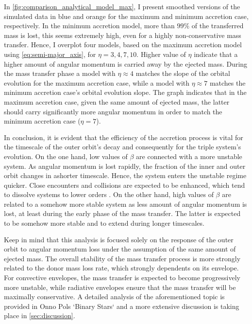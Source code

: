 In \cref{fig:comparison_analytical_model_max}, I present smoothed versions of the simulated data in blue and orange for the maximum and minimum accretion case, respectively. In the minimum accretion model, more than $99\%$ of the transferred mass is lost, this seems extremely high, even for a highly non-conservative mass transfer. Hence, I overplot four models, based on the maximum accretion model using \cref{eq:semi-major_axis}, for $\eta = 3,4,7,10$. Higher value of $\eta$ indicate that a higher amount of angular momentum is carried away by the ejected mass. During the mass transfer phase a model with $\eta \approx 4$ matches the slope of the orbital evolution for the maximum accretion case, while a model with $\eta \approx 7$ matches the minimum accretion case's orbital evolution slope. The graph indicates that in the maximum accretion case, given the same amount of ejected mass, the latter should carry significantly more angular momentum in order to match the minimum accretion case ($\eta = 7$). 

In conclusion, it is evident that the efficiency of the accretion process is vital for the timescale of the outer orbit's decay and consequently for the triple system's evolution. On the one hand, low values of $\beta$ are connected with a more unstable system. As angular momentum is lost rapidly, the fraction of the inner and outer orbit changes in ashorter timescale. Hence, the system enters the unstable regime quicker. Close encounters and collisions are expected to be enhanced, which tend to dissolve systems to lower orders \citep{van2007formation}. On the other hand, high values of $\beta$ are related to a somehow more stable system as less amount of angular momentum is lost, at least during the early phase of the mass transfer. The latter is expected to be somehow more stable and to extend during longer timescales.

Keep in mind that this analysis is focused solely on the response of the outer orbit to angular momentum loss under the assumption of the same amount of ejected mass. The overall stability of the mass transfer process is more strongly related to the donor mass loss rate, which strongly dependents on its envelope. For convective envelopes, the mass transfer is expected to become progressively more unstable, while radiative envelopes ensure that the mass transfer will be maximally conservative. A detailed analysis of the aforementioned topic is provided in Onno Pols `Binary Stars` and a more extensive discussion is taking place in \cref{sec:discussion}.


